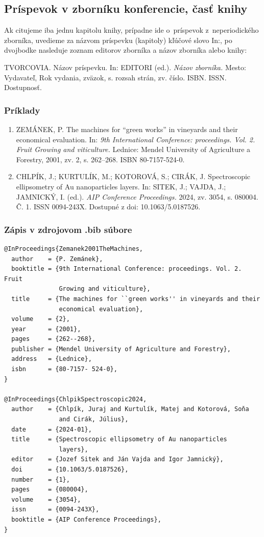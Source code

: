 \subsection{Príspevok v zborníku konferencie, časť knihy}
Ak citujeme iba jednu kapitolu knihy,
prípadne ide o~príspevok z~neperiodického zborníka, 
uvedieme za názvom príspevku (kapitoly)
kľúčové slovo In:, po dvojbodke nasleduje zoznam editorov zborníka a názov zborníka alebo knihy: 
\begin{trivlist}
  \item TVORCOVIA. Názov príspevku. In: EDITORI (ed.). \textit{Názov zborníka.} Mesto: Vydavateľ, Rok vydania, zväzok, s. rozsah strán, zv. číslo. ISBN. ISSN. Dostupnosť.
\end{trivlist}

\subsubsection*{\normalsize Príklady}
\begin{enumerate}
  \item ZEMÁNEK, P. The machines for ``green works'' in vineyards and their economical evaluation. In: \textit{9th International Conference: proceedings. Vol. 2. Fruit Growing and viticulture.} Lednice: Mendel University of Agriculture a Forestry, 2001, zv. 2, s. 262–268. ISBN 80-7157-524-0.
  
  \item CHLPÍK, J.; KURTULÍK, M.; KOTOROVÁ, S.; CIRÁK, J. Spectroscopic ellipsometry of Au nanoparticles layers. In: SITEK, J.; VAJDA, J.; JAMNICKÝ, I. (ed.). \textit{AIP Conference Proceedings.} 2024, zv. 3054, s. 080004. Č. 1. ISSN 0094-243X. Dostupné z doi: 10.1063/5.0187526.
\end{enumerate}

\subsubsection*{\normalsize Zápis v zdrojovom .bib súbore}
\begin{verbatim}
@InProceedings{Zemanek2001TheMachines,
  author    = {P. Zemánek},
  booktitle = {9th International Conference: proceedings. Vol. 2. Fruit
               Growing and viticulture},
  title     = {The machines for ``green works'' in vineyards and their
               economical evaluation},
  volume    = {2},
  year      = {2001},
  pages     = {262--268},
  publisher = {Mendel University of Agriculture and Forestry},
  address   = {Lednice},
  isbn      = {80-7157- 524-0},
}

@InProceedings{ChlpikSpectroscopic2024,
  author    = {Chlpík, Juraj and Kurtulík, Matej and Kotorová, Soňa
               and Cirák, Július},
  date      = {2024-01},
  title     = {Spectroscopic ellipsometry of Au nanoparticles
               layers},
  editor    = {Jozef Sitek and Ján Vajda and Igor Jamnický},
  doi       = {10.1063/5.0187526},
  number    = {1},
  pages     = {080004},
  volume    = {3054},
  issn      = {0094-243X},
  booktitle = {AIP Conference Proceedings},
}
\end{verbatim}

